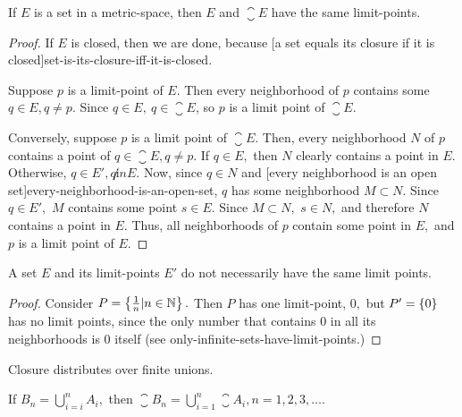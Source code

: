 \documentclass{article}
\begin{document}
\begin{theorem}\label{set-and-closure-have-same-limit-points}
If $E$ is a set in a \@{metric-space}, then $E$ and $\closure{E}$ have the same \@{limit-points}.
\end{theorem}

\begin{proof}
If $E$ is closed, then we are done, because \@[a set equals its closure if it is closed]{set-is-its-closure-iff-it-is-closed}. 

Suppose $p$ is a \@{limit-point} of $E.$ Then every neighborhood of $p$ contains some $q \in E, q \neq p.$ Since $q \in E, ~ q \in \closure{E}$, so $p$ is a limit point of $\closure{E}.$

Conversely, suppose $p$ is a limit point of $\closure{E}.$ Then, every neighborhood $N$ of $p$ contains a point of $q \in \closure{E}, q \neq p.$ If $q \in E,$ then $N$ clearly contains a point in $E.$ Otherwise, $q \in E', q \not in E.$ Now, since $q \in N$ and \@[every neighborhood is an open set]{every-neighborhood-is-an-open-set}, $q$ has some neighborhood $M \subset N.$ Since $q \in E',$ $M$ contains some point $s \in E.$ Since $M \subset N,$ $s \in N,$ and therefore $N$ contains a point in $E.$ Thus, all neighborhoods of $p$ contain some point in $E,$ and $p$ is a limit point of $E.$
\end{proof}

\begin{theorem}\label{set-and-its-limit-points-may-have-different-limit-points}
A set $E$ and its \@{limit-points} $E'$ do not necessarily have the same limit points.
\end{theorem}

\begin{proof}
Consider $P = \left\{ \frac{1}{n} | n \in \mathbb{N} \right\}.$ Then $P$ has one \@{limit-point}, $0,$ but $P' = \left\{ 0 \right\}$ has no limit points, since the only number that contains $0$ in all its \@{neighborhoods} is $0$ itself (see \@{only-infinite-sets-have-limit-points}.)
\end{proof}

\begin{theorem}\label{closure-distributes-over-finite-unions}
\@{Closure} distributes over \@{finite} unions.

If $B_n = \bigcup_{i=i}^n A_i,$ then $\closure{B_n} = \bigcup_{i=1}^n \closure{A_i}, n = 1, 2, 3, \dots.$
\end{theorem}
\end{document}
